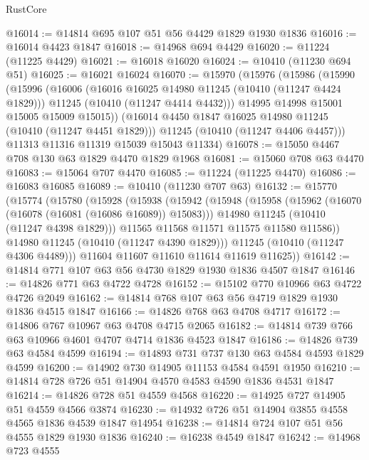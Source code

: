 \begin{lexlean}{RustCore}
\begin{coremodule}
@16014 := @14814 @695 @107 @51 @56 @4429 @1829 @1930 @1836
@16016 := @16014 @4423 @1847
@16018 := @14968 @694 @4429
@16020 := @11224 (@11225 @4429)
@16021 := @16018 @16020
@16024 := @10410 (@11230 @694 @51)
@16025 := @16021 @16024
@16070 := @15970
    (@15976
      (@15986
        (@15990
          (@15996
            (@16006
              (@16016 @16025 @14980 @11245 (@10410 (@11247 @4424 @1829)))
              @11245
              (@10410 (@11247 @4414 @4432)))
            @14995
            @14998
            @15001
            @15005
            @15009
            @15015))
        (@16014 @4450 @1847 @16025 @14980 @11245 (@10410 (@11247 @4451 @1829)))
        @11245
        (@10410 (@11247 @4406 @4457)))
      @11313
      @11316
      @11319
      @15039
      @15043
      @11334)
@16078 := @15050 @4467 @708 @130 @63 @1829 @4470 @1829 @1968
@16081 := @15060 @708 @63 @4470
@16083 := @15064 @707 @4470
@16085 := @11224 (@11225 @4470)
@16086 := @16083 @16085
@16089 := @10410 (@11230 @707 @63)
@16132 := @15770
    (@15774
      (@15780
        (@15928
          (@15938
            (@15942
              (@15948
                (@15958
                  (@15962 (@16070 (@16078 (@16081 (@16086 @16089)) @15083)))
                  @14980
                  @11245
                  (@10410 (@11247 @4398 @1829)))
                @11565
                @11568
                @11571
                @11575
                @11580
                @11586))
            @14980
            @11245
            (@10410 (@11247 @4390 @1829)))
          @11245
          (@10410 (@11247 @4306 @4489)))
        @11604
        @11607
        @11610
        @11614
        @11619
        @11625))
@16142 := @14814 @771 @107 @63 @56 @4730 @1829 @1930 @1836 @4507 @1847
@16146 := @14826 @771 @63 @4722 @4728
@16152 := @15102 @770 @10966 @63 @4722 @4726 @2049
@16162 := @14814 @768 @107 @63 @56 @4719 @1829 @1930 @1836 @4515 @1847
@16166 := @14826 @768 @63 @4708 @4717
@16172 := @14806 @767 @10967 @63 @4708 @4715 @2065
@16182 := @14814 @739 @766 @63 @10966 @4601 @4707 @4714 @1836 @4523 @1847
@16186 := @14826 @739 @63 @4584 @4599
@16194 := @14893 @731 @737 @130 @63 @4584 @4593 @1829 @4599
@16200 := @14902 @730 @14905 @11153 @4584 @4591 @1950
@16210 := @14814 @728 @726 @51 @14904 @4570 @4583 @4590 @1836 @4531 @1847
@16214 := @14826 @728 @51 @4559 @4568
@16220 := @14925 @727 @14905 @51 @4559 @4566 @3874
@16230 := @14932 @726 @51 @14904 @3855 @4558 @4565 @1836 @4539 @1847 @14954
@16238 := @14814 @724 @107 @51 @56 @4555 @1829 @1930 @1836
@16240 := @16238 @4549 @1847
@16242 := @14968 @723 @4555

\end{coremodule}
\end{lexlean}
